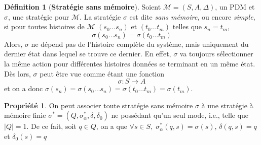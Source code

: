 \documentclass[12pt,a4paper]{report}
\theoremstyle{definition}%
\newtheorem{definition}{Définition}[chapter]
\newtheorem{propriete}{Propriété}[chapter]
\theoremstyle{remark}
\begin{document}
\begin{definition}[\textbf{Stratégie sans mémoire}]
	Soient $\mathcal{M} = (S, A, \Delta)$, un PDM et $\sigma$, une stratégie
	pour $\mathcal{M}$. La stratégie $\sigma$ est dite \textit{sans mémoire},
	ou encore \textit{simple}, si pour toutes histoires de $\mathcal{M}$ $(s_0 \dots s_n)$ et
	$(t_0 \dots t_m)$ telles que $s_n = t_m$,
	\[
		\sigma(s_0 \dots s_n) = \sigma(t_0 \dots t_m)
	\]
	Alors, $\sigma$ ne dépend pas de l'histoire complète du système, mais
	uniquement du dernier état dans lequel se trouve ce dernier. En effet,
	$\sigma$ va toujours sélectionner la même action pour différentes histoires données
	se terminant en un même état.
	Dès lors, $\sigma$ peut être vue comme étant une fonction
	\[
		\sigma: S \rightarrow A
	\]
	et on a donc
	$\sigma(s_n) = \sigma(s_0 \dots s_n) = \sigma(t_0 \dots t_m) = \sigma(t_m)$.
\end{definition}
\begin{propriete}
On peut associer toute stratégie sans mémoire $\sigma$ à une stratégie à mémoire finie $\sigma^* = (Q, \sigma^*_\alpha, \delta, \delta_0)$ ne possédant qu'un seul mode, i.e., telle que $|Q| = 1$. De ce fait, soit $q \in Q$, on a que
	$\forall s \in S, \; \sigma^*_\alpha(q, s) = \sigma(s)$,
	 $\delta(q, s) = q$ et
	 $\delta_0(s) = q$
\end{propriete}
\end{document}
